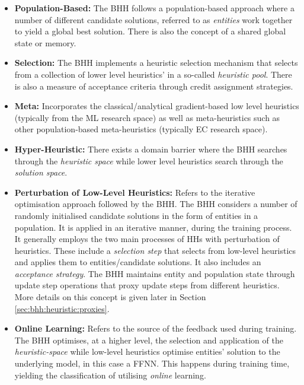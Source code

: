 \begin{itemize}
      \item \textbf{Population-Based:} The \ac{BHH} follows a population-based approach where a number of different candidate solutions, referred to as \textit{entities} work together to yield a global best solution. There is also the concept of a shared global state or memory.

      \item \textbf{Selection:} The \ac{BHH} implements a heuristic selection mechanism that selects from a collection of lower level heuristics' in a so-called \textit{heuristic pool}. There is also a measure of acceptance criteria through credit assignment strategies.

      \item \textbf{Meta:} Incorporates the classical/analytical gradient-based low level heuristics (typically from the \ac{ML} research space) as well as meta-heuristics such as other population-based meta-heuristics (typically \ac{EC} research space).

      \item \textbf{Hyper-Heuristic:} There exists a domain barrier where the \ac{BHH} searches through the \textit{heuristic space} while lower level heuristics search through the \textit{solution space}.

      \item \textbf{Perturbation of Low-Level Heuristics:} Refers to the iterative optimisation approach followed by the \ac{BHH}. The \ac{BHH} considers a number of randomly initialised candidate solutions in the form of entities in a population. It is applied in an iterative manner, during the training process. It generally employs the two main processes of \acp{HH} with perturbation of heuristics. These include a \textit{selection step} that selects from low-level heuristics and applies them to entities/candidate solutions. It also includes an \textit{acceptance strategy}. The \ac{BHH} maintains entity and population state through update step operations that proxy update steps from different heuristics. More details on this concept is given later in Section \ref{sec:bhh:heuristic:proxies}.

      \item \textbf{Online Learning:} Refers to the source of the feedback used during training. The \ac{BHH} optimises, at a higher level, the selection and application of the \textit{heuristic-space} while low-level heuristics optimise entities' solution to the underlying model, in this case a \ac{FFNN}. This happens during training time, yielding the classification of utilising \textit{online} learning.
\end{itemize}


